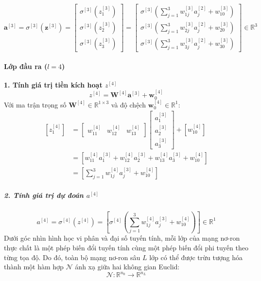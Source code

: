 \begin{equation}
    \mathbf{a}^{[3]} = \sigma^{[3]}\left(\mathbf{z}^{[3]}\right) 
    = \begin{bmatrix} 
        \sigma^{[3]}\left(z_1^{[3]}\right) \\ 
        \sigma^{[3]}\left(z_2^{[3]}\right) \\ 
        \sigma^{[3]}\left(z_3^{[3]}\right) 
    \end{bmatrix} 
    = \begin{bmatrix} 
        \sigma^{[3]}\left( \sum_{j=1}^{3} w_{1j}^{[3]} a_j^{[2]} + w_{10}^{[3]} \right) \\
        \sigma^{[3]}\left( \sum_{j=1}^{3} w_{2j}^{[3]} a_j^{[2]} + w_{20}^{[3]} \right) \\
        \sigma^{[3]}\left( \sum_{j=1}^{3} w_{3j}^{[3]} a_j^{[2]} + w_{30}^{[3]} \right)
    \end{bmatrix} \in \mathbb{R}^3
\end{equation}
\paragraph{Lớp đầu ra ($l = 4$)\\} 
\textbf{1. Tính giá trị tiền kích hoạt $z^{[4]}$}
\begin{equation}
    z^{[4]} = \mathbf{W}^{[4]} \mathbf{a}^{[3]} + \mathbf{w}_0^{[4]}
\end{equation}
Với ma trận trọng số $\mathbf{W}^{[4]} \in \mathbb{R}^{1 \times 3}$ và độ chệch $\mathbf{w}_0^{[4]} \in \mathbb{R}^1$:
\begin{align}
    \left[ z_1^{[4]} \right] 
    &= \begin{bmatrix} w_{11}^{[4]} & w_{12}^{[4]} & w_{13}^{[4]} \end{bmatrix}
    \begin{bmatrix} a_1^{[3]} \\ a_2^{[3]} \\ a_3^{[3]} \end{bmatrix} 
    + \left[ w_{10}^{[4]} \right] \nonumber \\
    &= \left[ w_{11}^{[4]} a_1^{[3]} + w_{12}^{[4]} a_2^{[3]} + w_{13}^{[4]} a_3^{[3]} + w_{10}^{[4]} \right] \nonumber \\
    &= \left[ \sum_{j=1}^{3} w_{1j}^{[4]} a_j^{[3]} + w_{10}^{[4]} \right]
\end{align}
\subparagraph{2. Tính giá trị dự đoán $a^{[4]}$\\}
\begin{equation}
    a^{[4]} = \sigma^{[4]}\left(z^{[4]}\right) 
    = \left[ \sigma^{[4]}\left( \sum_{j=1}^{3} w_{1j}^{[4]} a_j^{[3]} + w_{10}^{[4]} \right) \right] \in \mathbb{R}^1
\end{equation}
Dưới góc nhìn hình học vi phân và đại số tuyến tính, mỗi lớp của mạng nơ-ron thực chất là một phép biến đổi tuyến tính cùng một phép biến đổi phi tuyến theo từng tọa độ. Do đó, toàn bộ mạng nơ-ron sâu $L$ lớp có thể được trừu tượng hóa thành một hàm hợp $\mathcal{N}$ ánh xạ giữa hai không gian Euclid:
\begin{equation}
    \mathcal{N}: \mathbb{R}^{n_0} \to \mathbb{R}^{n_L}
\end{equation}

